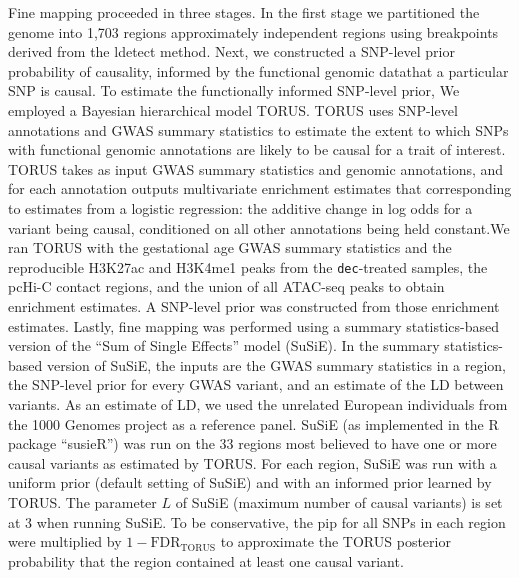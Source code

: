 Fine mapping proceeded in three stages. In the first stage we partitioned the genome into 1,703 regions approximately independent regions using breakpoints derived from the ldetect method\cite{ldetect}.
Next, we constructed a SNP-level prior probability of causality, informed by the functional genomic datathat a particular SNP is causal.  To estimate the functionally informed SNP-level prior, We employed a Bayesian
hierarchical model TORUS\cite{torus}.  TORUS uses SNP-level annotations and GWAS summary statistics to estimate the extent to which SNPs with functional genomic annotations are likely to be causal for a trait of interest.  
TORUS takes as input GWAS summary statistics and genomic annotations, and for each annotation outputs multivariate enrichment estimates that corresponding to estimates from a logistic regression: 
the additive change in log odds for a variant being causal, conditioned on all other annotations being held constant.We ran TORUS with the gestational age GWAS summary statistics and the reproducible
H3K27ac and H3K4me1 peaks from the \texttt{dec}-treated samples, the pcHi-C contact regions, and the union of all ATAC-seq peaks to obtain enrichment estimates. A SNP-level prior was constructed from those enrichment estimates.
Lastly, fine mapping was performed using a summary statistics-based version of the “Sum of Single Effects” model (SuSiE\cite{susie}).  
In the summary statistics-based version of SuSiE, the inputs are the GWAS summary statistics in a region, the SNP-level prior for every GWAS variant, and an estimate of the LD between variants. 
As an estimate of LD, we used the unrelated European individuals from the 1000 Genomes project as a reference panel. SuSiE (as implemented in the R package “susieR”) was run on the 33 regions most 
believed to have one or more causal variants as estimated by TORUS. For each region, SuSiE was run with a uniform prior (default setting of SuSiE) and with an informed prior learned 
by TORUS. The parameter $L$ of SuSiE (maximum number of causal variants) is set at 3 when running SuSiE.  To be conservative, the pip for all SNPs in each region were multiplied by $1-\text{FDR}_{\text{TORUS}}$ to approximate the
TORUS posterior probability that the region contained at least one causal variant.



